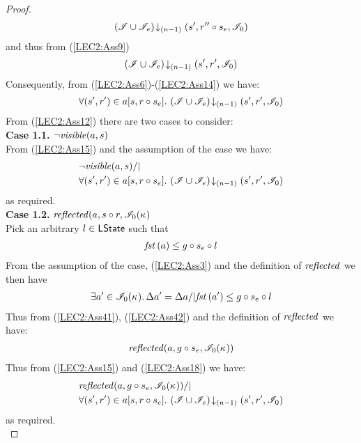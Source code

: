\begin{lemma}
\begin{proof}
%
\begin{align*}
	\left(\mathscr{I} \cup \mathscr{I}_{e}\right) \!\downarrow_{(n-1)} \left(s', r'' \circ s_e, \mathscr{I}_0\right)
\end{align*}
%
and thus from (\ref{LEC2:Ass9})
%
\begin{align}
	\left(\mathscr{I} \cup \mathscr{I}_{e}\right) \!\downarrow_{(n-1)} \left(s', r', \mathscr{I}_0\right)
	\label{LEC2:Ass14}
\end{align}
%
Consequently, from (\ref{LEC2:Ass6})-(\ref{LEC2:Ass14}) we have:
%
\begin{align}
	\forall (s', r') \in a[s, r \circ s_e].\, \left(\mathscr{I} \cup \mathscr{I}_e\right) \!\downarrow_{(n-1)} \left(s', r', \mathscr{I}_0\right)
	\label{LEC2:Ass15}
\end{align}
%
From (\ref{LEC2:Ass12}) there are two cases to consider:\\
\textbf{Case 1.1. }$\neg\mathit{visible}(a, s)$\\
From (\ref{LEC2:Ass15}) and the assumption of the case we have:
\begin{align*}
	& \neg\mathit{visible}(a, s) /| \\
	& \forall (s', r') \in a[s, r \circ s_e].\, \left(\mathscr{I} \cup \mathscr{I}_e\right) \!\downarrow_{(n-1)} \left(s', r', \mathscr{I}_0\right)
\end{align*}
% 
as required. \\
%
%
%

\noindent\textbf{Case 1.2. }$\mathit{reflected}(a, s \circ r, \mathscr{I}_0(\kappa_{})$\\
Pick an arbitrary $l \in \textsf{LState}$ such that 
\begin{align}
	\mathit{fst}\left(a\right) \leq g \circ s_e \circ l \label{LEC2:Ass16}
\end{align} 
%
From the assumption of the case, (\ref{LEC2:Ass3}) and the definition of $\mathit{reflected}$ we then have
%
\begin{align}
	\exists a' \in \mathscr{I}_0(\kappa_{}).\, \Delta {a'} = \Delta {a} /| \mathit{fst}\left(a'\right) \leq g \circ s_e \circ l \label{LEC2:Ass17}
\end{align}
%
Thus from (\ref{LEC2:Ass41}), (\ref{LEC2:Ass42}) and the definition of $\mathit{reflected}$ we have:
%
\begin{align}
	\mathit{reflected}(a, g \circ s_e, \mathscr{I}_0(\kappa_{}))
	\label{LEC2:Ass18}
\end{align}
%
Thus from (\ref{LEC2:Ass15}) and (\ref{LEC2:Ass18}) we have:
\begin{align*}
	& \mathit{reflected}(a, g \circ s_e, \mathscr{I}_0(\kappa_{})) /| \\
	& \forall (s', r') \in a[s, r \circ s_e].\, \left(\mathscr{I} \cup \mathscr{I}_e\right) \!\downarrow_{(n-1)} \left(s', r', \mathscr{I}_0\right)
\end{align*}
%
as required.\\
%
%
%




\end{proof}
\end{lemma}
